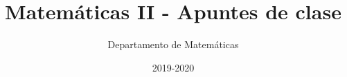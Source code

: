 \documentclass[nobuilddate,nochap]{Docencia}
\title{Matemáticas II - Apuntes de clase}
\author{Departamento de Matemáticas}
\date{2019-2020}
\begin{document}
\pagestyle{plain}
\maketitle
\tableofcontents
\newpage

\newcommand{\hide}[1]{#1}

\renewcommand{\vec}[1]{\overrightarrow{#1}}



    
    

    




%
%
%
%
%


\newpage
\printindex
\listoffigures
\listoftables
\end{document}
